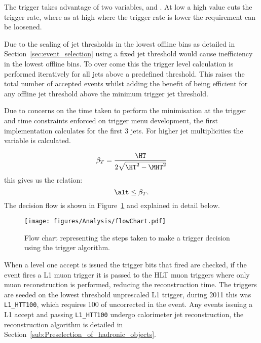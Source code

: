 The trigger takes advantage of two variables, \HT and \alt. At low 
\HT a high \alt value cuts the trigger rate, where as at high \HT where the
trigger rate is lower the \alt requirement can be loosened.

Due to the scaling of jet thresholds in the lowest offline \HT bins as detailed 
in Section~\ref{sec:event_selection} using a fixed jet threshold would cause 
inefficiency in the lowest offline \HT bins. To over come this the trigger 
level \alt calculation is performed iteratively for all jets above a predefined 
threshold. This raises the total number of accepted events whilst adding the 
benefit of being efficient for any offline jet threshold above the minimum 
trigger jet threshold.

Due to concerns on the time taken to perform the \dHT minimisation at the 
trigger and time constraints enforced on trigger menu development, the first 
implementation calculates \alt for the first 3 jets. For higher jet 
multiplicities the variable \bt is calculated.

\begin{equation}
  \beta_{T} = \frac{\HT}{2\sqrt{\HT^{2} - \MHT^{2}}}
  \label{eqn:betaT}
\end{equation}
this gives us the relation:
\begin{equation}
  \alt \leq \beta_{T}.
\end{equation}
The decision flow is shown in Figure~\ref{fig:figures_Analysis_flowChart} and 
explained in detail below.

\begin{figure}[ht|]
  \centering
    \texttt{[image: figures/Analysis/flowChart.pdf]}
  \caption{Flow chart representing the steps taken to make a trigger decision 
  using the \alt trigger algorithm.}
  \label{fig:figures_Analysis_flowChart}
\end{figure}


When a level one accept is issued the trigger bits that fired are checked, if 
the event fires a L1 muon trigger it is passed to the HLT muon triggers where 
only muon reconstruction is performed, reducing the reconstruction time. The 
\alt triggers are seeded on the lowest threshold unprescaled L1 \HT trigger, 
during 2011 this was \texttt{L1\_HTT100}, which requires \unit{100}{\GeV} of 
uncorrected \HT in the event. Any events issuing a L1 accept and passing 
\texttt{L1\_HTT100} undergo calorimeter jet reconstruction, the reconstruction 
algorithm is detailed in Section~\ref{sub:Preselection_of_hadronic_objects}.

